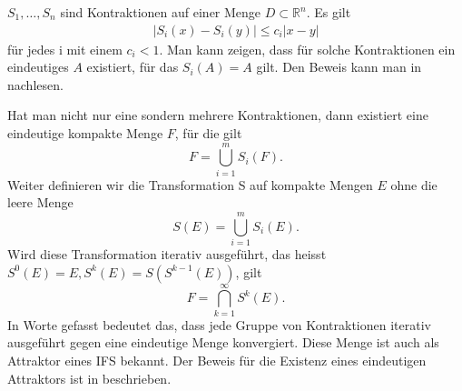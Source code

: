 $S_1,\dots,S_n$ sind Kontraktionen auf einer Menge $D \subset \mathbb{R}^n$. Es gilt
\begin{align}
	|S_i(x) - S_i(y)| \leq c_i|x - y|
\end{align}
für jedes i mit einem $c_i < 1$.
Man kann zeigen, dass für solche Kontraktionen ein eindeutiges $A$ existiert, für das $S_i(A) = A$ gilt.
Den Beweis kann man in \cite{ifs:Rousseau2012} nachlesen.

Hat man nicht nur eine sondern mehrere Kontraktionen, dann existiert eine eindeutige kompakte Menge $F$, für die gilt
\begin{equation}
	F = \bigcup\limits_{i = 1}^{m} S_i(F).
\end{equation}
Weiter definieren wir die Transformation S auf kompakte Mengen $E$ ohne die leere Menge
\begin{equation}
	S(E) = \bigcup\limits_{i = 1}^m S_i(E).
	\label{ifs:transformation}
\end{equation}
Wird diese Transformation iterativ ausgeführt, das heisst $S^0(E) = E, S^k(E) = S(S^{k-1}(E))$, gilt
\begin{equation}
	F = \bigcap\limits_{k = 1}^{\infty} S^k(E).
	\label{ifs:ifsForm}
\end{equation}
In Worte gefasst bedeutet das, dass jede Gruppe von Kontraktionen iterativ ausgeführt gegen eine eindeutige Menge konvergiert.
Diese Menge ist auch als Attraktor eines IFS bekannt.
Der Beweis für die Existenz eines eindeutigen Attraktors ist in \cite{ifs:fractal-geometry} beschrieben. 

